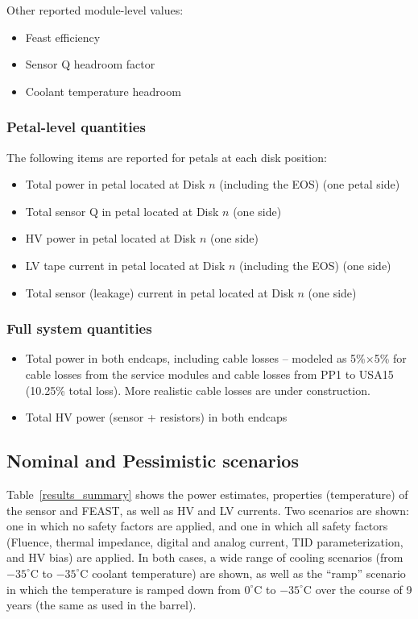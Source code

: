 Other reported module-level values:
\begin{itemize}
\setlength\itemsep{0.0em}
\item Feast efficiency
\item Sensor Q headroom factor
\item Coolant temperature headroom
\end{itemize}

\subsubsection{Petal-level quantities}

The following items are reported for petals at each disk position:
\begin{itemize}
\setlength\itemsep{0.0em}
\item Total power in petal located at Disk $n$ (including the EOS) (one petal side)
\item Total sensor Q in petal located at Disk $n$ (one side)
\item HV power in petal located at Disk $n$ (one side)
\item LV tape current in petal located at Disk $n$ (including the EOS) (one side)
\item Total sensor (leakage) current in petal located at Disk $n$ (one side)
\end{itemize}

\subsubsection{Full system quantities}

\begin{itemize}
\setlength\itemsep{0.0em}
\item Total power in both endcaps, including cable losses -- modeled as 
5\%$\times$5\% for cable losses from the service modules and cable losses from PP1 to USA15 (10.25\% total loss).
More realistic cable losses are under construction.
\item Total HV power (sensor + resistors) in both endcaps
\end{itemize}

\subsection{Nominal and Pessimistic scenarios}

Table~\ref{results_summary} shows the power estimates, properties (temperature) of the sensor and
FEAST, as well as HV and LV currents. Two scenarios are shown: one in which no safety factors are
applied, and one in which all safety factors (Fluence, thermal impedance, digital and analog current,
TID parameterization, and HV bias) are applied. In both cases, a wide range of cooling scenarios
(from $-35^\circ$C to $-35^\circ$C coolant temperature) are shown, as well as the ``ramp'' scenario
in which the temperature is ramped down from $0^\circ$C to $-35^\circ$C over the course of 9 years
(the same as used in the barrel).

